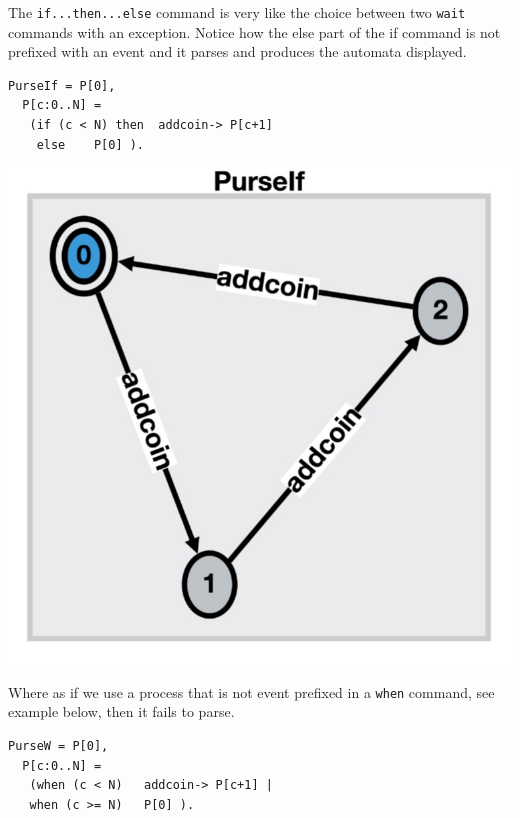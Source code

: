 \documentclass[]{article}
\begin{document}
{\color{red}
The \verb|if...then...else| command is very like the choice between two \verb|wait| commands with an exception.  Notice how the else part of the if command is not prefixed with an event and it parses and produces the automata displayed.

\begin{center}\begin{minipage}{0.5\textwidth}
\begin{verbatim}
PurseIf = P[0],
  P[c:0..N] =  
   (if (c < N) then  addcoin-> P[c+1] 
    else    P[0] ).\end{verbatim} 
\end{minipage}
\begin{minipage}{0.45\textwidth}
\includegraphics[scale=0.15]{PurseIf.jpg}
\end{minipage}\end{center}

Where as if we use a process that is not event prefixed in a \verb|when| command, see example below, then it fails to parse. 
\begin{center}\begin{minipage}{0.5\textwidth}
\begin{verbatim}
PurseW = P[0],
  P[c:0..N] =  
   (when (c < N)   addcoin-> P[c+1] |
   when (c >= N)   P[0] ).\end{verbatim} 
\end{minipage}\end{center}
}
\end{document}
